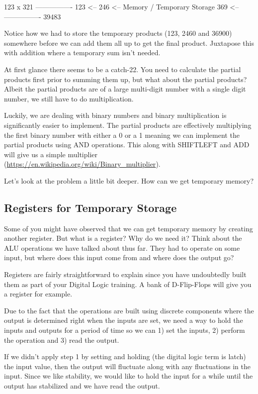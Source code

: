 \begin{code}
          123
x         321
----------------
          123   <--
         246    <--   Memory / Temporary Storage
        369     <--
----------------
        39483
\end{code}

Notice how we had to store the temporary products (123, 2460 and 36900) somewhere before we can add them all up to get the final product. Juxtapose this with addition where a temporary sum isn’t needed. 

At first glance there seems to be a catch-22. You need to calculate the partial products first prior to summing them up, but what about the partial products? Albeit the partial products are of a large multi-digit number with a single digit number, we still have to do multiplication. 

Luckily, we are dealing with binary numbers and binary multiplication is significantly easier to implement. The partial products are effectively multiplying the first binary number with either a 0 or a 1 meaning we can implement the partial products using AND operations.  This along with SHIFTLEFT and ADD will give us a simple multiplier (\url{https://en.wikipedia.org/wiki/Binary_multiplier}). 

Let’s look at the problem a little bit deeper. How can we get temporary memory?

\subsection{Registers for Temporary Storage}

Some of you might have observed that we can get temporary memory by creating another register. But what is a register? Why do we need it? Think about the ALU operations we have talked about thus far. They had to operate on some input, but where does this input come from and where does the output go?

Registers are fairly straightforward to explain since you have undoubtedly built them as part of your Digital Logic training. A bank of D-Flip-Flops will give you a register for example. 

Due to the fact that the operations are built using discrete components where the output is determined right when the inputs are set, we need a way to hold the inputs and outputs for a period of time so we can 1) set the inputs, 2) perform the operation and 3) read the output. 

If we didn’t apply step 1 by setting and holding (the digital logic term is latch) the input value, then the output will fluctuate along with any fluctuations in the input. Since we like stability, we would like to hold the input for a while until the output has stabilized and we have read the output. 

